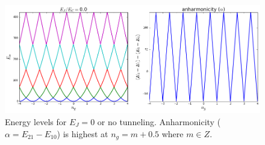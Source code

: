 \begin{figure}
\centering
\includegraphics[width=\linewidth]{Figures/EjEc=0.png}
\decoRule
\caption[Energy Level for $E_J=0$]{Energy levels for $E_J=0$ or no tunneling. Anharmonicity ($\alpha = E_{21}-E_{10}$) is highest at $n_g=m+0.5$ where $m\in Z$.}
\label{fig:CPB EJ=0}
\end{figure}

